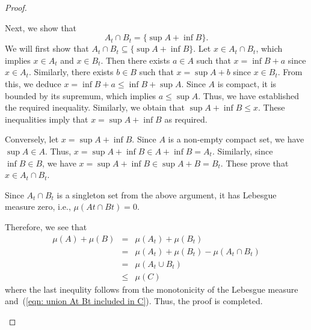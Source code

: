 \begin{proof}
\begin{enumerate}
\begin{enumerate}
            Next, we show that 
            \begin{equation*}
                A_t \cap B_t = \{\sup A + \inf B\}.
            \end{equation*}
            We will first show that \(A_t \cap B_t \subseteq \{\sup A + \inf B\}\). 
            Let \(x \in A_t \cap B_t\), which implies \(x \in A_t\) and \(x \in B_t\).
            Then there exists \(a \in A\) such that \(x = \inf B + a\) since \(x \in A_t\). 
            Similarly, there exists \(b \in B\) such that \(x = \sup A + b\) since \(x \in B_t\).
            From this, we deduce \(x = \inf B + a \leq \inf B + \sup A\). 
            Since \(A\) is compact, it is bounded by its supremum, which implies \(a \leq \sup A\).
            Thus, we have established the required inequality. 
            Similarly, we obtain that \(\sup A + \inf B \leq x\). 
            These inequalities imply that \(x = \sup A + \inf B\) as required.

            Conversely, let \(x = \sup A + \inf B\).
            Since \(A\) is a non-empty compact set, we have \(\sup A \in A\).
            Thus, \(x = \sup A + \inf B \in A + \inf B = A_t\).
            Similarly, since \(\inf B \in B\), we have \(x = \sup A + \inf B \in \sup A + B = B_t\).
            These prove that \(x \in A_t \cap B_t\).

            Since \(A_t \cap B_t\) is a singleton set from the above argument, it has Lebesgue measure zero, 
            i.e., \(\mu (At \cap Bt) = 0\).

            Therefore, we see that 
            \begin{eqnarray*}
                \mu(A) + \mu(B) & = & \mu(A_t) + \mu(B_t)\\
                & = & \mu(A_t) + \mu(B_t) - \mu(A_t \cap B_t)\\
                & = & \mu(A_t \cup B_t)\\
                & \leq & \mu (C)
            \end{eqnarray*}
            where the last inequlity follows from the monotonicity of the Lebesgue measure and~(\ref{eqn: union At Bt included in C}).
            Thus, the proof is completed.
        \end{enumerate}
    \end{enumerate}
\end{proof}